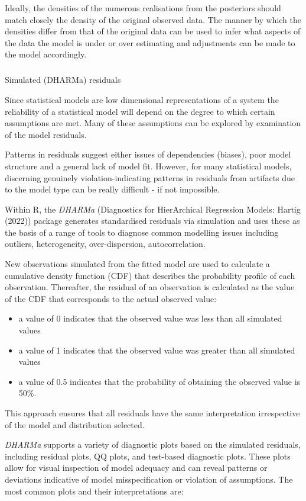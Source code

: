 \documentclass[
  8pt,
  a4paper]{article}
\makeatletter
\let\oldsubparagraph\subparagraph
\renewcommand{\subparagraph}{
    \@ifstar
      \xxxSubParagraphStar
      \xxxSubParagraphNoStar
  }
\newcommand{\xxxSubParagraphStar}[1]{\oldsubparagraph*{#1}\mbox{}}
\newcommand{\xxxSubParagraphNoStar}[1]{\oldsubparagraph{#1}\mbox{}}
\providecommand{\tightlist}{%
  \setlength{\itemsep}{0pt}\setlength{\parskip}{0pt}}\usepackage{longtable,booktabs,array}
\makeatother
\begin{document}
Ideally, the densities of the numerous realisations from the posteriors
should match closely the density of the original observed data. The
manner by which the densities differ from that of the original data can
be used to infer what aspects of the data the model is under or over
estimating and adjustments can be made to the model accordingly.

\subparagraph{Simulated (DHARMa)
residuals}\label{simulated-dharma-residuals}

Since statistical models are low dimensional representations of a system
the reliability of a statistical model will depend on the degree to
which certain assumptions are met. Many of these assumptions can be
explored by examination of the model residuals.

Patterns in residuals suggest either issues of dependencies (biases),
poor model structure and a general lack of model fit. However, for many
statistical models, discerning genuinely violation-indicating patterns
in residuals from artifacts due to the model type can be really
difficult - if not impossible.

Within R, the \emph{DHARMa} (Diagnostics for HierArchical Regression
Models: Hartig (2022)) package generates standardised residuals via
simulation and uses these as the basis of a range of tools to diagnose
common modelling issues including outliers, heterogeneity,
over-dispersion, autocorrelation.

New observations simulated from the fitted model are used to calculate a
cumulative density function (CDF) that describes the probability profile
of each observation. Thereafter, the residual of an observation is
calculated as the value of the CDF that corresponds to the actual
observed value:

\begin{itemize}
\tightlist
\item
  a value of 0 indicates that the observed value was less than all
  simulated values
\item
  a value of 1 indicates that the observed value was greater than all
  simulated values
\item
  a value of 0.5 indicates that the probability of obtaining the
  observed value is 50\%.
\end{itemize}

This approach ensures that all residuals have the same interpretation
irrespective of the model and distribution selected.

\emph{DHARMa} supports a variety of diagnostic plots based on the
simulated residuals, including residual plots, QQ plots, and test-based
diagnostic plots. These plots allow for visual inspection of model
adequacy and can reveal patterns or deviations indicative of model
misspecification or violation of assumptions. The most common plots and
their interpretations are:
\end{document}
